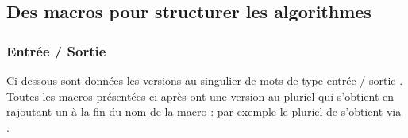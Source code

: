 \documentclass[12pt,a4paper]{article}
\begin{document}

\subsection{Des macros pour structurer les algorithmes}

\subsubsection{Entrée / Sortie}

Ci-dessous sont données les versions au singulier de mots de type \og entrée / sortie \fg{}.
Toutes les macros présentées ci-après ont une version au pluriel qui s'obtient en rajoutant un  à la fin du nom de la macro : par exemple le pluriel de  s'obtient via .




\end{document}
